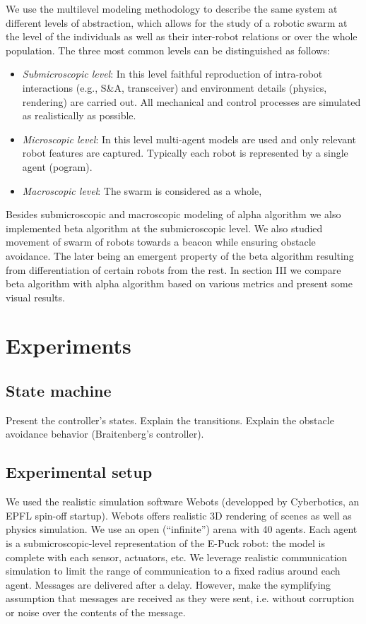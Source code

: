 \documentclass[a4paper, 10pt, conference]{ieeeconf}
\begin{document}
  We use the multilevel modeling methodology to describe the same system at different levels of abstraction, which allows for the study of a robotic swarm at the level of the individuals as well as their inter-robot relations or over the whole population. The three most common levels can be distinguished as follows:
\begin{itemize}
  \item \textit{Submicroscopic level}: In this level faithful reproduction of intra-robot interactions (e.g.,
  S\&A, transceiver) and environment details (physics, rendering) are carried out. All mechanical and control processes are simulated as realistically as possible.
  \item \textit{Microscopic level}: In this level multi-agent models are used and only relevant robot features are captured. Typically each robot is represented by a single agent (pogram).
  \item \textit{Macroscopic level}: The swarm is considered as a whole,
\end{itemize}



  Besides submicroscopic and macroscopic modeling of alpha algorithm we also implemented beta algorithm at the submicroscopic level. We also studied movement of swarm of robots towards a beacon while ensuring obstacle avoidance. The later being an emergent property of the beta algorithm resulting from differentiation of certain robots from the rest. In section III we compare beta algorithm with alpha algorithm based on various metrics and present some visual results.


\section{Experiments}
  \subsection{State machine}
  Present the controller's states. Explain the transitions. Explain the obstacle avoidance behavior (Braitenberg's controller).

  \subsection{Experimental setup} \label{simulations}
  We used the realistic simulation software Webots (developped by Cyberbotics, an EPFL spin-off startup). Webots offers realistic 3D rendering of scenes as well as physics simulation. We use an open (``infinite'') arena with 40 agents. Each agent is a submicroscopic-level representation of the E-Puck robot: the model is complete with each sensor, actuators, etc. We leverage realistic communication simulation to limit the range of communication to a fixed radius around each agent. Messages are delivered after a delay. However, make the symplifying assumption that messages are received as they were sent, i.e. without corruption or noise over the contents of the message.\\
\end{document}
